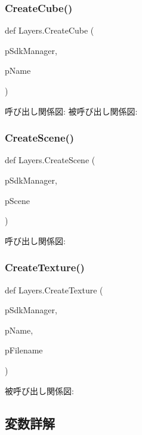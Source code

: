 \subsubsection{\texorpdfstring{Create\+Cube()}{CreateCube()}}
{\footnotesize\ttfamily def Layers.\+Create\+Cube (\begin{DoxyParamCaption}\item[{}]{p\+Sdk\+Manager,  }\item[{}]{p\+Name }\end{DoxyParamCaption})}

呼び出し関係図\+:
被呼び出し関係図\+:
\mbox{\label{namespace_layers_a309c2ef4c98c67e113f0a309920375b1}} 
\subsubsection{\texorpdfstring{Create\+Scene()}{CreateScene()}}
{\footnotesize\ttfamily def Layers.\+Create\+Scene (\begin{DoxyParamCaption}\item[{}]{p\+Sdk\+Manager,  }\item[{}]{p\+Scene }\end{DoxyParamCaption})}

呼び出し関係図\+:
\mbox{\label{namespace_layers_a50b169040adfa797674d44bd44f68236}} 
\subsubsection{\texorpdfstring{Create\+Texture()}{CreateTexture()}}
{\footnotesize\ttfamily def Layers.\+Create\+Texture (\begin{DoxyParamCaption}\item[{}]{p\+Sdk\+Manager,  }\item[{}]{p\+Name,  }\item[{}]{p\+Filename }\end{DoxyParamCaption})}

被呼び出し関係図\+:


\subsection{変数詳解}
\mbox{\label{namespace_layers_afb15a9755945901420de60df6f679122}} 
